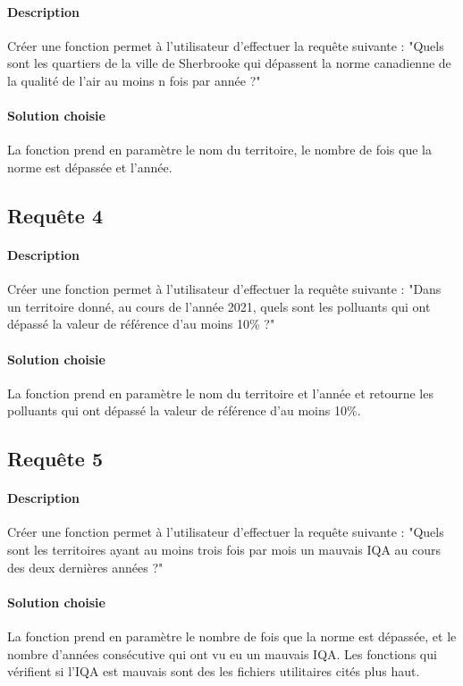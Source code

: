 \documentclass{article}
\begin{document}
\paragraph{Description} Créer une fonction permet à l'utilisateur
d'effectuer la requête suivante : "Quels sont les quartiers de la ville
de Sherbrooke qui dépassent la norme canadienne de la qualité de l'air
au moins n fois par année ?"

\paragraph{Solution choisie}
La fonction prend en paramètre le nom du territoire, le nombre de fois que la norme est dépassée et l'année.

\subsection{Requête 4}
\paragraph{Description} Créer une fonction permet à l'utilisateur
d'effectuer la requête suivante : "Dans un territoire donné, au cours de
l'année 2021, quels sont les polluants qui ont dépassé la valeur de 
référence d'au moins 10\% ?"

\paragraph{Solution choisie}
La fonction prend en paramètre le nom du territoire et l'année et retourne les polluants qui ont dépassé la valeur de référence d'au moins 10\%.

\subsection{Requête 5}
\paragraph{Description} Créer une fonction permet à l'utilisateur
d'effectuer la requête suivante : "Quels sont les territoires ayant au
moins trois fois par mois un mauvais IQA au cours des deux dernières
années ?"

\paragraph{Solution choisie}
La fonction prend en paramètre le nombre de fois que la norme est dépassée, et le nombre d'années consécutive qui ont vu eu un mauvais IQA.
Les fonctions qui vérifient si l'IQA est mauvais sont des les fichiers utilitaires cités plus haut.
\end{document}
